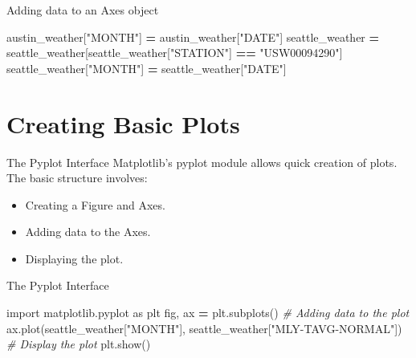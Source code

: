 \documentclass[
  ignorenonframetext,
]{beamer}
\newenvironment{Shaded}{\begin{snugshade}}{\end{snugshade}}
\newcommand{\CommentTok}[1]{\textcolor[rgb]{0.56,0.35,0.01}{\textit{#1}}}
\newcommand{\ImportTok}[1]{#1}
\newcommand{\NormalTok}[1]{#1}
\newcommand{\OperatorTok}[1]{\textcolor[rgb]{0.81,0.36,0.00}{\textbf{#1}}}
\newcommand{\StringTok}[1]{\textcolor[rgb]{0.31,0.60,0.02}{#1}}
\providecommand{\tightlist}{%
  \setlength{\itemsep}{0pt}\setlength{\parskip}{0pt}}
\begin{document}
\begin{frame}[fragile]{Adding data to an Axes object}
\label{adding-data-to-an-axes-object-4}

\begin{Shaded}
\begin{Highlighting}[]
\NormalTok{austin\_weather[}\StringTok{"MONTH"}\NormalTok{] }\OperatorTok{=}\NormalTok{ austin\_weather[}\StringTok{"DATE"}\NormalTok{]}
\NormalTok{seattle\_weather }\OperatorTok{=}\NormalTok{ seattle\_weather[seattle\_weather[}\StringTok{"STATION"}\NormalTok{] }\OperatorTok{==} \StringTok{"USW00094290"}\NormalTok{]}
\NormalTok{seattle\_weather[}\StringTok{"MONTH"}\NormalTok{] }\OperatorTok{=}\NormalTok{ seattle\_weather[}\StringTok{"DATE"}\NormalTok{]}
\end{Highlighting}
\end{Shaded}
\end{frame}

\section{Creating Basic Plots}\label{creating-basic-plots}

\begin{frame}{The Pyplot Interface}
\label{the-pyplot-interface}
Matplotlib's pyplot module allows quick creation of plots. The basic
structure involves:

\begin{itemize}
\tightlist
\item
  Creating a Figure and Axes.
\item
  Adding data to the Axes.
\item
  Displaying the plot.
\end{itemize}
\end{frame}

\begin{frame}[fragile]{The Pyplot Interface}
\label{the-pyplot-interface-1}
\begin{Shaded}
\begin{Highlighting}[]
\ImportTok{import}\NormalTok{ matplotlib.pyplot }\ImportTok{as}\NormalTok{ plt}
\NormalTok{fig, ax }\OperatorTok{=}\NormalTok{ plt.subplots()}
\CommentTok{\# Adding data to the plot}
\NormalTok{ax.plot(seattle\_weather[}\StringTok{"MONTH"}\NormalTok{], seattle\_weather[}\StringTok{"MLY{-}TAVG{-}NORMAL"}\NormalTok{])}
\CommentTok{\# Display the plot}
\NormalTok{plt.show()}
\end{Highlighting}
\end{Shaded}
\end{frame}
\end{document}
